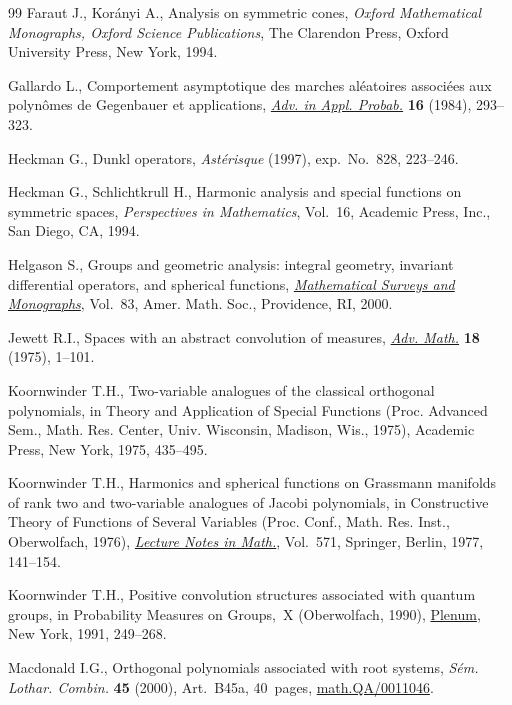 \documentclass[pdftex]{sigma}
\numberwithin{equation}{section}
\begin{document}
\begin{thebibliography}{99}
Faraut J., Kor{\'a}nyi A., Analysis on symmetric cones, \textit{Oxford Mathematical
  Monographs, Oxford Science Publications}, The Clarendon Press, Oxford
  University Press, New York, 1994.

Gallardo L., Comportement asymptotique des marches al\'eatoires associ\'ees aux
  polyn\^omes de {G}egenbauer et applications, \href{http://dx.doi.org/10.2307/1427071}{\textit{Adv. in Appl. Probab.}}
  \textbf{16} (1984), 293--323.

Heckman G., Dunkl operators, \textit{Ast\'erisque}  (1997), exp.~No.~828,
  223--246.

Heckman G., Schlichtkrull H., Harmonic analysis and special functions on
  symmetric spaces, \textit{Perspectives in Mathematics}, Vol.~16, Academic
  Press, Inc., San Diego, CA, 1994.



Helgason S., Groups and geometric analysis: integral geometry, invariant
  dif\/ferential operators, and spherical functions, \href{http://dx.doi.org/10.1090/surv/083}{\textit{Mathematical Surveys
  and Monographs}}, Vol.~83, Amer. Math. Soc., Providence, RI, 2000.

Jewett R.I., Spaces with an abstract convolution of measures, \href{http://dx.doi.org/10.1016/0001-8708(75)90002-X}{\textit{Adv.
  Math.}} \textbf{18} (1975), 1--101.

Koornwinder T.H., Two-variable analogues of the classical orthogonal
  polynomials, in Theory and Application of Special Functions ({P}roc.
  {A}dvanced {S}em., {M}ath. {R}es. {C}enter, {U}niv. {W}isconsin, {M}adison,
  {W}is., 1975), Academic Press, New York, 1975, 435--495.

Koornwinder T.H., Harmonics and spherical functions on {G}rassmann manifolds of
  rank two and two-variable analogues of {J}acobi polynomials, in Constructive
  Theory of Functions of Several Variables ({P}roc. {C}onf., {M}ath. {R}es.
  {I}nst., {O}berwolfach, 1976), \href{http://dx.doi.org/10.1007/BFb0086570}{\textit{Lecture Notes in Math.}}, Vol.~571,
  Springer, Berlin, 1977, 141--154.

Koornwinder T.H., Positive convolution structures associated with quantum
  groups, in Probability Measures on Groups,~{X} ({O}berwolfach, 1990), \href{http://dx.doi.org/10.1007/978-1-4899-2364-6_18}{Plenum},
  New York, 1991, 249--268.

Macdonald I.G., Orthogonal polynomials associated with root systems,
  \textit{S\'em. Lothar. Combin.} \textbf{45} (2000), Art.~B45a, 40~pages,
  \href{http://arxiv.org/abs/math.QA/0011046}{math.QA/0011046}.


\end{thebibliography}
\end{document}
